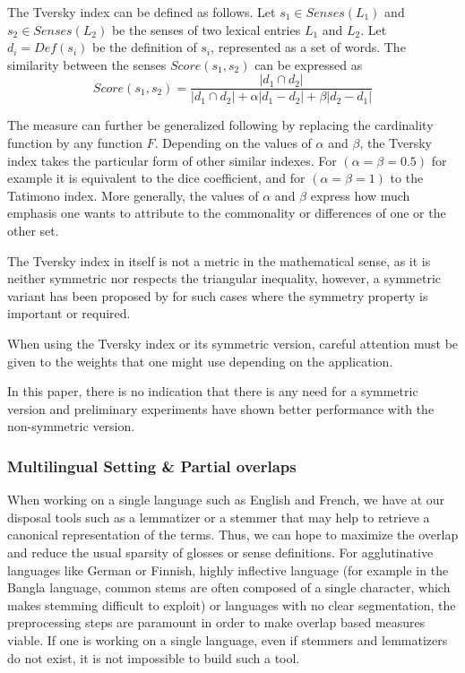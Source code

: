 \documentclass[10pt, a4paper]{article}
\begin{document}
The Tversky index can be defined as follows. Let \(s_1 \in Senses(L_1)\)  and \(s_2 \in Senses(L_2)\) be the senses of two lexical entries \(L_1\) and \(L_2\). Let \(d_i=Def(s_i)\) be the definition of \(s_i\), represented as a set of words. The similarity between the senses \(Score(s_1, s_2)\) can be expressed as 
\[
Score(s_1,s_2) = 
\frac{|d_1\cap d_2|}{|d_1\cap d_2| + \alpha |d_1-d_2| + \beta |d_2-d_1|}
\]

The measure can further be generalized following \cite{DBLP:conf/otm/PirroE10} by replacing the cardinality function by any function \(F\). Depending on the values of \(\alpha\) and \(\beta\), the Tversky index takes the particular form of other similar indexes. For \((\alpha=\beta=0.5)\) for example it is equivalent to the dice coefficient, and for  \((\alpha=\beta=1)\) to the Tatimono index. More generally, the values of \(\alpha\) and \(\beta\) express how much emphasis one wants to attribute to the commonality or differences of one or the other set.

 The Tversky index in itself is not a metric in the mathematical sense, as it is neither symmetric nor respects the triangular inequality, however, a symmetric variant has been proposed by \cite{Jimenez2010} for such cases where the symmetry property is important or required.
% 
 
 When using the Tversky index or its symmetric version, careful attention must be given to the weights that one might use depending on the application. 
 
 In this paper, there is no indication that there is any need for a symmetric version and preliminary experiments have shown better performance with the non-symmetric version.

\subsubsection{Multilingual Setting \& Partial overlaps}
 When working on a single language such as English and French, we have at our disposal tools such as a lemmatizer or a stemmer that may help to retrieve a canonical representation of the terms. Thus, we can hope to maximize the overlap and reduce the usual sparsity of glosses or sense definitions. For agglutinative languages like German or Finnish, highly inflective language (for example in the Bangla language, common stems are often composed of a single character, which makes stemming difficult to exploit) or languages with no clear segmentation, the preprocessing steps are paramount in order to make overlap based measures viable. If one is working on a single language, even if stemmers and lemmatizers do not exist, it is not impossible to build such a tool.
\end{document}
